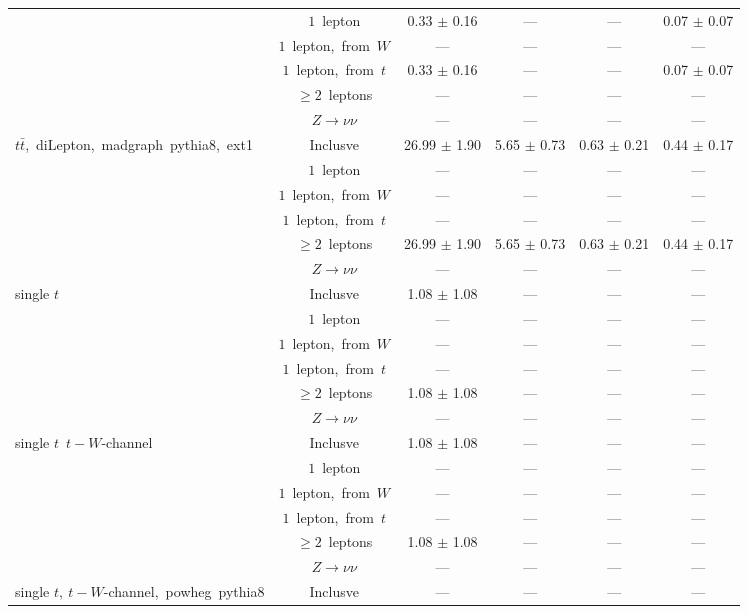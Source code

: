 \documentclass{article}
\begin{document}
\begin{longtable}{|l|c|c|c|c|c|}
 & $1$~lepton  & 0.33 $\pm$ 0.16  & ---  & ---  & 0.07 $\pm$ 0.07 \\* 
 & $1$~lepton,~from~$W$  & ---  & ---  & ---  & --- \\* 
 & $1$~lepton,~from~$t$  & 0.33 $\pm$ 0.16  & ---  & ---  & 0.07 $\pm$ 0.07 \\* 
 & $\ge2$~leptons  & ---  & ---  & ---  & --- \\* 
 & $Z\rightarrow\nu\nu$  & ---  & ---  & ---  & --- \\* 
\hline 
\multirow{6}{*}{$t\bar{t}$,~diLepton,~madgraph~pythia8,~ext1} & Inclusve  & 26.99 $\pm$ 1.90  & 5.65 $\pm$ 0.73  & 0.63 $\pm$ 0.21  & 0.44 $\pm$ 0.17 \\* 
 & $1$~lepton  & ---  & ---  & ---  & --- \\* 
 & $1$~lepton,~from~$W$  & ---  & ---  & ---  & --- \\* 
 & $1$~lepton,~from~$t$  & ---  & ---  & ---  & --- \\* 
 & $\ge2$~leptons  & 26.99 $\pm$ 1.90  & 5.65 $\pm$ 0.73  & 0.63 $\pm$ 0.21  & 0.44 $\pm$ 0.17 \\* 
 & $Z\rightarrow\nu\nu$  & ---  & ---  & ---  & --- \\* 
\hline 
\multirow{6}{*}{single $t$} & Inclusve  & 1.08 $\pm$ 1.08  & ---  & ---  & --- \\* 
 & $1$~lepton  & ---  & ---  & ---  & --- \\* 
 & $1$~lepton,~from~$W$  & ---  & ---  & ---  & --- \\* 
 & $1$~lepton,~from~$t$  & ---  & ---  & ---  & --- \\* 
 & $\ge2$~leptons  & 1.08 $\pm$ 1.08  & ---  & ---  & --- \\* 
 & $Z\rightarrow\nu\nu$  & ---  & ---  & ---  & --- \\* 
\hline 
\multirow{6}{*}{single $t$~$t-W$-channel} & Inclusve  & 1.08 $\pm$ 1.08  & ---  & ---  & --- \\* 
 & $1$~lepton  & ---  & ---  & ---  & --- \\* 
 & $1$~lepton,~from~$W$  & ---  & ---  & ---  & --- \\* 
 & $1$~lepton,~from~$t$  & ---  & ---  & ---  & --- \\* 
 & $\ge2$~leptons  & 1.08 $\pm$ 1.08  & ---  & ---  & --- \\* 
 & $Z\rightarrow\nu\nu$  & ---  & ---  & ---  & --- \\* 
\hline 
\multirow{6}{*}{single $t,~t-W$-channel,~powheg~pythia8} & Inclusve  & ---  & ---  & ---  & --- \\* 

\end{longtable}
\end{document}
